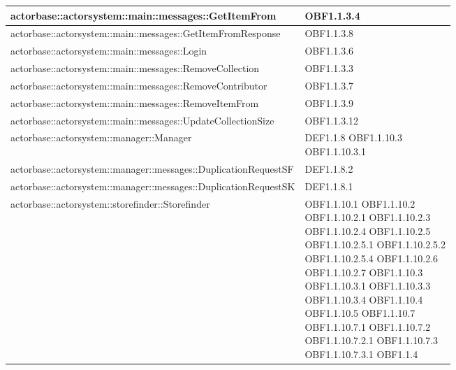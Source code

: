 \documentclass{scalatekids-article}
\begin{document}
\begin{longtable}[H]{|p{12cm}|p{5.5cm}|}
\hline
actorbase::actorsystem::main::messages::GetItemFrom & \multiLineCell[t]{OBF1.1.3.4\\}\\
\hline
actorbase::actorsystem::main::messages::GetItemFromResponse & \multiLineCell[t]{OBF1.1.3.8\\}\\
\hline
actorbase::actorsystem::main::messages::Login & \multiLineCell[t]{OBF1.1.3.6\\}\\
\hline
actorbase::actorsystem::main::messages::RemoveCollection & \multiLineCell[t]{OBF1.1.3.3\\}\\
\hline
actorbase::actorsystem::main::messages::RemoveContributor & \multiLineCell[t]{OBF1.1.3.7\\}\\
\hline
actorbase::actorsystem::main::messages::RemoveItemFrom & \multiLineCell[t]{OBF1.1.3.9\\}\\
\hline
actorbase::actorsystem::main::messages::UpdateCollectionSize & \multiLineCell[t]{OBF1.1.3.12\\}\\
\hline
actorbase::actorsystem::manager::Manager & \multiLineCell[t]{DEF1.1.8 OBF1.1.10.3\\OBF1.1.10.3.1}\\
\hline
actorbase::actorsystem::manager::messages::DuplicationRequestSF & \multiLineCell[t]{DEF1.1.8.2\\}\\
\hline
actorbase::actorsystem::manager::messages::DuplicationRequestSK & \multiLineCell[t]{DEF1.1.8.1\\}\\
\hline
actorbase::actorsystem::storefinder::Storefinder & \multiLineCell[t]{OBF1.1.10.1 OBF1.1.10.2\\OBF1.1.10.2.1 OBF1.1.10.2.3\\OBF1.1.10.2.4 OBF1.1.10.2.5\\OBF1.1.10.2.5.1 OBF1.1.10.2.5.2\\OBF1.1.10.2.5.4 OBF1.1.10.2.6\\OBF1.1.10.2.7 OBF1.1.10.3\\OBF1.1.10.3.1 OBF1.1.10.3.3\\OBF1.1.10.3.4 OBF1.1.10.4\\OBF1.1.10.5 OBF1.1.10.7\\OBF1.1.10.7.1 OBF1.1.10.7.2\\OBF1.1.10.7.2.1 OBF1.1.10.7.3\\OBF1.1.10.7.3.1 OBF1.1.4\\}\\

\end{longtable}
\end{document}
